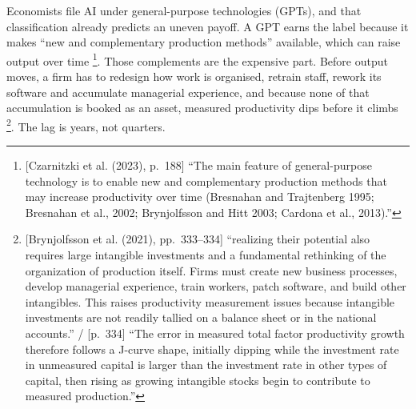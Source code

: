 Economists file AI under general-purpose technologies (GPTs), and that classification
already predicts an uneven payoff. A GPT earns the label because it makes ``new and
complementary production methods'' available, which can raise output over
time \parencite[p.~188]{czarnitzki2023artificial}\footnote{[Czarnitzki et al. (2023),
p.~188] ``The main feature of general-purpose technology is to enable new and
complementary production methods that may increase productivity over time (Bresnahan
and Trajtenberg 1995; Bresnahan et al., 2002; Brynjolfsson and Hitt 2003; Cardona
et al., 2013).''}. Those complements are the expensive part. Before output moves, a
firm has to redesign how work is organised, retrain staff, rework its software and
accumulate managerial experience, and because none of that accumulation is booked as
an asset, measured productivity dips before it
climbs \parencite[pp.~333--334]{brynjolfsson2021productivity}\footnote{[Brynjolfsson
et al. (2021), pp.~333--334] ``realizing their potential also requires large intangible
investments and a fundamental rethinking of the organization of production itself.
Firms must create new business processes, develop managerial experience, train workers,
patch software, and build other intangibles. This raises productivity measurement
issues because intangible investments are not readily tallied on a balance sheet or in
the national accounts.'' / [p.~334] ``The error in measured total factor productivity
growth therefore follows a J-curve shape, initially dipping while the investment rate in
unmeasured capital is larger than the investment rate in other types of capital, then
rising as growing intangible stocks begin to contribute to measured
production.''}. The lag is years, not quarters.

